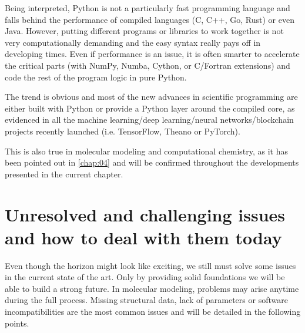 Being interpreted, Python is not a particularly fast programming language and falls behind the performance of compiled languages (C, C++, Go, Rust) or even Java. However, putting different programs or libraries to work together is not very computationally demanding and the easy syntax really pays off in developing times. Even if performance is an issue, it is often smarter to accelerate the critical parts (with NumPy,\cite{numpy} Numba,\cite{numba} Cython,\cite{cython} or C/Fortran extensions) and code the rest of the program logic in pure Python.

The trend is obvious and most of the new advances in scientific programming are either built with Python or provide a Python layer around the compiled core, as evidenced in all the machine learning/deep learning/neural networks/blockchain projects recently launched (i.e. TensorFlow,\cite{tensorflow} Theano\cite{theano} or PyTorch\cite{pytorch}).

This is also true in molecular modeling and computational chemistry, as it has been pointed out in \autoref{chap:04} and will be confirmed throughout the developments presented in the current chapter.



\section{Unresolved and challenging issues and how to deal with them today}
 Even though the horizon might look like exciting, we still must solve some issues in the current state of the art.  Only by providing solid foundations we will be able to build a strong future. In molecular modeling, problems may arise anytime during the full process. Missing structural data, lack of parameters or software incompatibilities are the most common issues and will be detailed in the following points.

